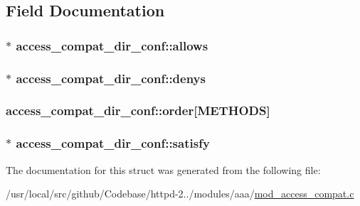 \subsection{Field Documentation}
\subsubsection[{\texorpdfstring{allows}{allows}}]{$\ast$ access\+\_\+compat\+\_\+dir\+\_\+conf\+::allows}\hypertarget{structaccess__compat__dir__conf_a328d57b57a2ccb68c18f11beb33368bb}{}\label{structaccess__compat__dir__conf_a328d57b57a2ccb68c18f11beb33368bb}
\subsubsection[{\texorpdfstring{denys}{denys}}]{$\ast$ access\+\_\+compat\+\_\+dir\+\_\+conf\+::denys}\hypertarget{structaccess__compat__dir__conf_afb1dfc63e7b4dda5b82d5ef234689604}{}\label{structaccess__compat__dir__conf_afb1dfc63e7b4dda5b82d5ef234689604}
\subsubsection[{\texorpdfstring{order}{order}}]{ access\+\_\+compat\+\_\+dir\+\_\+conf\+::order\mbox{[}{\bf M\+E\+T\+H\+O\+DS}\mbox{]}}\hypertarget{structaccess__compat__dir__conf_aaaec8797e301727b8d56415e8d16ec8e}{}\label{structaccess__compat__dir__conf_aaaec8797e301727b8d56415e8d16ec8e}
\subsubsection[{\texorpdfstring{satisfy}{satisfy}}]{$\ast$ access\+\_\+compat\+\_\+dir\+\_\+conf\+::satisfy}\hypertarget{structaccess__compat__dir__conf_abf82df3781b9b6d564b358d873288428}{}\label{structaccess__compat__dir__conf_abf82df3781b9b6d564b358d873288428}


The documentation for this struct was generated from the following file\+:\begin{DoxyCompactItemize}
\item 
/usr/local/src/github/\+Codebase/httpd-\/2../modules/aaa/\hyperlink{mod__access__compat_8c}{mod\+\_\+access\+\_\+compat.\+c}\end{DoxyCompactItemize}
